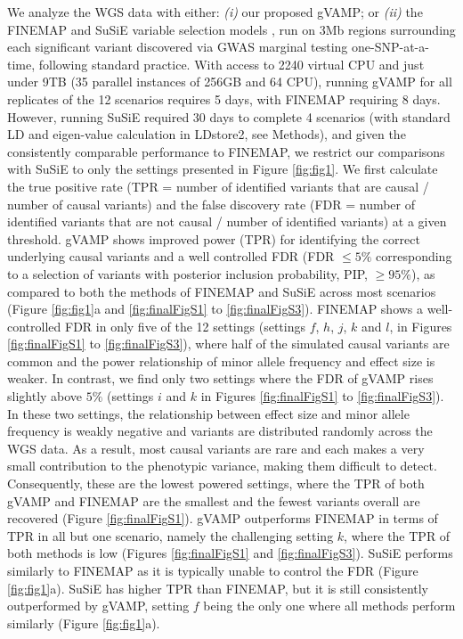 We analyze the WGS data with either: \emph{(i)} our proposed gVAMP; or \emph{(ii)} the FINEMAP \cite{10.1093/bioinformatics/btw018} and SuSiE variable selection models \cite{susie}, run on 3Mb regions surrounding each significant variant discovered via GWAS marginal testing one-SNP-at-a-time, following standard practice. With access to 2240 virtual CPU and just under 9TB (35 parallel instances of 256GB and 64 CPU), running gVAMP for all replicates of the 12 scenarios requires 5 days, with FINEMAP requiring 8 days. However, running SuSiE required 30 days to complete 4 scenarios (with standard LD and eigen-value calculation in LDstore2, see Methods), and given the consistently comparable performance to FINEMAP, we restrict our comparisons with SuSiE to only the settings presented in Figure \ref{fig:fig1}. 
We first calculate the true positive rate (TPR = number of identified variants that are causal / number of causal variants) and the false discovery rate (FDR = number of identified variants that are not causal / number of identified variants) at a given threshold. gVAMP shows improved power (TPR) for identifying the correct underlying causal variants and a well controlled FDR (FDR $\leq 5\%$ corresponding to a selection of variants with posterior inclusion probability, PIP, $\ge 95\%$), as compared to both the methods of FINEMAP and SuSiE across most scenarios (Figure \ref{fig:fig1}a and \ref{fig:finalFigS1} to \ref{fig:finalFigS3}). FINEMAP shows a well-controlled FDR in only five of the 12 settings (settings $f$, $h$, $j$, $k$ and $l$, in Figures \ref{fig:finalFigS1} to \ref{fig:finalFigS3}), where half of the simulated causal variants are common and the power relationship of minor allele frequency and effect size is weaker. In contrast, we find only two settings where the FDR of gVAMP rises slightly above $5\%$ (settings $i$ and $k$ in Figures \ref{fig:finalFigS1} to \ref{fig:finalFigS3}). In these two settings, the relationship between effect size and minor allele frequency is weakly negative and variants are distributed randomly across the WGS data. As a result, most causal variants are rare and each makes a very small contribution to the phenotypic variance, making them difficult to detect. Consequently, these are the lowest powered settings, where the TPR of both gVAMP and FINEMAP are the smallest and the fewest variants overall are recovered (Figure \ref{fig:finalFigS1}). gVAMP outperforms FINEMAP in terms of TPR in all but one scenario, namely the challenging setting $k$, where the TPR of both methods is low (Figures \ref{fig:finalFigS1} and \ref{fig:finalFigS3}). SuSiE performs similarly to FINEMAP as it is typically unable to control the FDR (Figure \ref{fig:fig1}a). SuSiE has higher TPR than FINEMAP, but it is still consistently outperformed by gVAMP, setting $f$ being the only one where all methods perform similarly (Figure \ref{fig:fig1}a).

